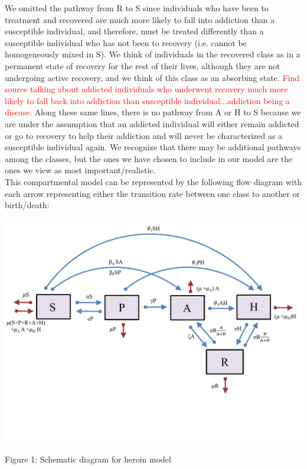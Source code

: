 \documentclass[12pt]{article}
\begin{document}


We omitted the pathway from R to S since individuals who have been to treatment and recovered are much more likely to fall into addiction than a susceptible individual, and therefore, must be treated differently than a susceptible individual who has not been to recovery (i.e. cannot be homogeneously mixed in S). We think of individuals in the recovered class as in a permanent state of recovery for the rest of their lives, although they are not undergoing active recovery, and we think of this class as an absorbing state. \textcolor{red}{Find source talking about addicted individuals who underwent recovery much more likely to fall back into addiction than susceptible individual...addiction being a disease.} Along these same lines, there is no pathway from A or H to S because we are under the assumption that an addicted individual will either remain addicted or go to recovery to help their addiction and will never be characterized as a susceptible individual again. We recognize that there may be additional pathways among the classes, but the ones we have chosen to include in our model are the ones we view as most important/realistic. \\ 

This compartmental model can be represented by the following flow diagram with each arrow representing either the transition rate between one class to another or birth/death: 

\includegraphics[scale=0.6]{heroin_schematic.pdf}
\vspace{-0.8cm}
\begin{center}
Figure 1: Schematic diagram for heroin model
\end{center}
\end{document}
